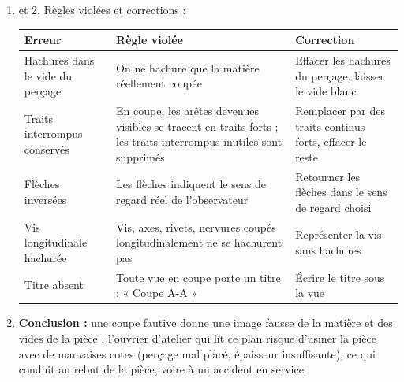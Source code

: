 \documentclass[11pt]{article}
\begin{document}
\begin{corrige}
\begin{enumerate}
\item et 2. Règles violées et corrections :
\begin{center}
\begin{tabularx}{\linewidth}{|X|X|X|}
\hline
\rowcolor{popblueL} \textbf{Erreur} & \textbf{Règle violée} & \textbf{Correction} \\
\hline
Hachures dans le vide du perçage & On ne hachure que la matière réellement coupée & Effacer les hachures du perçage, laisser le vide blanc \\
\hline
Traits interrompus conservés & En coupe, les arêtes devenues visibles se tracent en traits forts ; les traits interrompus inutiles sont supprimés & Remplacer par des traits continus forts, effacer le reste \\
\hline
Flèches inversées & Les flèches indiquent le sens de regard réel de l'observateur & Retourner les flèches dans le sens de regard choisi \\
\hline
Vis longitudinale hachurée & Vis, axes, rivets, nervures coupés longitudinalement ne se hachurent pas & Représenter la vis sans hachures \\
\hline
Titre absent & Toute vue en coupe porte un titre : « Coupe A-A » & Écrire le titre sous la vue \\
\hline
\end{tabularx}
\end{center}
\item \textbf{Conclusion :} une coupe fautive donne une image fausse de la matière et des vides de la pièce ; l'ouvrier d'atelier qui lit ce plan risque d'usiner la pièce avec de mauvaises cotes (perçage mal placé, épaisseur insuffisante), ce qui conduit au rebut de la pièce, voire à un accident en service.
\end{enumerate}
\end{corrige}
\end{document}
